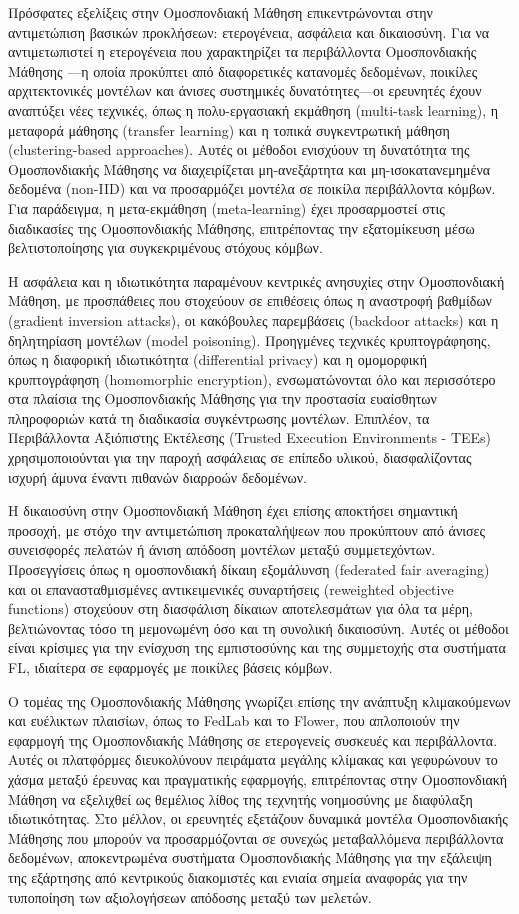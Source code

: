 Πρόσφατες εξελίξεις στην Ομοσπονδιακή Μάθηση επικεντρώνονται στην αντιμετώπιση βασικών προκλήσεων: ετερογένεια, ασφάλεια και δικαιοσύνη. Για να αντιμετωπιστεί η ετερογένεια που χαρακτηρίζει τα περιβάλλοντα Ομοσπονδιακής Μάθησης —η οποία προκύπτει από διαφορετικές κατανομές δεδομένων, ποικίλες αρχιτεκτονικές μοντέλων και άνισες συστημικές δυνατότητες—οι ερευνητές έχουν αναπτύξει νέες τεχνικές, όπως η πολυ-εργασιακή εκμάθηση (multi-task learning), η μεταφορά μάθησης (transfer learning) και η τοπικά συγκεντρωτική μάθηση (clustering-based approaches). Αυτές οι μέθοδοι ενισχύουν τη δυνατότητα της Ομοσπονδιακής Μάθησης να διαχειρίζεται μη-ανεξάρτητα και μη-ισοκατανεμημένα δεδομένα (non-IID) και να προσαρμόζει μοντέλα σε ποικίλα περιβάλλοντα κόμβων. Για παράδειγμα, η μετα-εκμάθηση (meta-learning) έχει προσαρμοστεί στις διαδικασίες της Ομοσπονδιακής Μάθησης, επιτρέποντας την εξατομίκευση μέσω βελτιστοποίησης για συγκεκριμένους στόχους κόμβων.

Η ασφάλεια και η ιδιωτικότητα παραμένουν κεντρικές ανησυχίες στην Ομοσπονδιακή Μάθηση, με προσπάθειες που στοχεύουν σε επιθέσεις όπως η αναστροφή βαθμίδων (gradient inversion attacks), οι κακόβουλες παρεμβάσεις (backdoor attacks) και η δηλητηρίαση μοντέλων (model poisoning). Προηγμένες τεχνικές κρυπτογράφησης, όπως η διαφορική ιδιωτικότητα (differential privacy) και η ομομορφική κρυπτογράφηση (homomorphic encryption), ενσωματώνονται όλο και περισσότερο στα πλαίσια της Ομοσπονδιακής Μάθησης για την προστασία ευαίσθητων πληροφοριών κατά τη διαδικασία συγκέντρωσης μοντέλων. Επιπλέον, τα Περιβάλλοντα Αξιόπιστης Εκτέλεσης (Trusted Execution Environments - TEEs) χρησιμοποιούνται για την παροχή ασφάλειας σε επίπεδο υλικού, διασφαλίζοντας ισχυρή άμυνα έναντι πιθανών διαρροών δεδομένων.

Η δικαιοσύνη στην Ομοσπονδιακή Μάθηση έχει επίσης αποκτήσει σημαντική προσοχή, με στόχο την αντιμετώπιση προκαταλήψεων που προκύπτουν από άνισες συνεισφορές πελατών ή άνιση απόδοση μοντέλων μεταξύ συμμετεχόντων. Προσεγγίσεις όπως η ομοσπονδιακή δίκαιη εξομάλυνση (federated fair averaging) και οι επανασταθμισμένες αντικειμενικές συναρτήσεις (reweighted objective functions) στοχεύουν στη διασφάλιση δίκαιων αποτελεσμάτων για όλα τα μέρη, βελτιώνοντας τόσο τη μεμονωμένη όσο και τη συνολική δικαιοσύνη. Αυτές οι μέθοδοι είναι κρίσιμες για την ενίσχυση της εμπιστοσύνης και της συμμετοχής στα συστήματα FL, ιδιαίτερα σε εφαρμογές με ποικίλες βάσεις κόμβων.

Ο τομέας της Ομοσπονδιακής Μάθησης γνωρίζει επίσης την ανάπτυξη κλιμακούμενων και ευέλικτων πλαισίων, όπως το FedLab και το Flower, που απλοποιούν την εφαρμογή της Ομοσπονδιακής Μάθησης σε ετερογενείς συσκευές και περιβάλλοντα. Αυτές οι πλατφόρμες διευκολύνουν πειράματα μεγάλης κλίμακας και γεφυρώνουν το χάσμα μεταξύ έρευνας και πραγματικής εφαρμογής, επιτρέποντας στην Ομοσπονδιακή Μάθηση να εξελιχθεί ως θεμέλιος λίθος της τεχνητής νοημοσύνης με διαφύλαξη ιδιωτικότητας. Στο μέλλον, οι ερευνητές εξετάζουν δυναμικά μοντέλα Ομοσπονδιακής Μάθησης που μπορούν να προσαρμόζονται σε συνεχώς μεταβαλλόμενα περιβάλλοντα δεδομένων, αποκεντρωμένα συστήματα Ομοσπονδιακής Μάθησης για την εξάλειψη της εξάρτησης από κεντρικούς διακομιστές και ενιαία σημεία αναφοράς για την τυποποίηση των αξιολογήσεων απόδοσης μεταξύ των μελετών.

